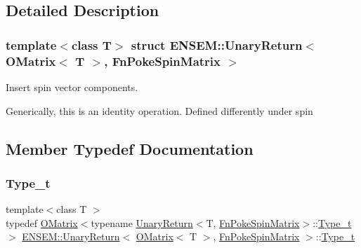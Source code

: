 \subsection{Detailed Description}
\subsubsection*{template$<$class T$>$\newline
struct E\+N\+S\+E\+M\+::\+Unary\+Return$<$ O\+Matrix$<$ T $>$, Fn\+Poke\+Spin\+Matrix $>$}

Insert spin vector components. 

Generically, this is an identity operation. Defined differently under spin 

\subsection{Member Typedef Documentation}
\mbox{\label{structENSEM_1_1UnaryReturn_3_01OMatrix_3_01T_01_4_00_01FnPokeSpinMatrix_01_4_a2018c95323ea7832f6e1e071be4629b8}} 
\subsubsection{\texorpdfstring{Type\_t}{Type\_t}\hspace{0.1cm}{\footnotesize\ttfamily [1/3]}}
{\footnotesize\ttfamily template$<$class T $>$ \\
typedef \mbox{\hyperlink{classENSEM_1_1OMatrix}{O\+Matrix}}$<$typename \mbox{\hyperlink{structENSEM_1_1UnaryReturn}{Unary\+Return}}$<$T, \mbox{\hyperlink{structENSEM_1_1FnPokeSpinMatrix}{Fn\+Poke\+Spin\+Matrix}}$>$\+::\mbox{\hyperlink{structENSEM_1_1UnaryReturn_3_01OMatrix_3_01T_01_4_00_01FnPokeSpinMatrix_01_4_a2018c95323ea7832f6e1e071be4629b8}{Type\+\_\+t}}$>$ \mbox{\hyperlink{structENSEM_1_1UnaryReturn}{E\+N\+S\+E\+M\+::\+Unary\+Return}}$<$ \mbox{\hyperlink{classENSEM_1_1OMatrix}{O\+Matrix}}$<$ T $>$, \mbox{\hyperlink{structENSEM_1_1FnPokeSpinMatrix}{Fn\+Poke\+Spin\+Matrix}} $>$\+::\mbox{\hyperlink{structENSEM_1_1UnaryReturn_3_01OMatrix_3_01T_01_4_00_01FnPokeSpinMatrix_01_4_a2018c95323ea7832f6e1e071be4629b8}{Type\+\_\+t}}}

